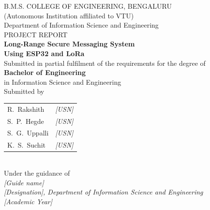 \documentclass[12pt,a4paper,oneside]{report}
\begin{document}
\begin{titlepage}
\centering
\vspace*{0.5cm}

{\large B.M.S. COLLEGE OF ENGINEERING, BENGALURU}\\[0.2cm]
{\normalsize (Autonomous Institution affiliated to VTU)}\\[1.2cm]

{\large Department of Information Science and Engineering}\\[2.0cm]

{\large PROJECT REPORT}\\[0.6cm]

{\LARGE\bfseries Long-Range Secure Messaging System\\[0.3cm]
Using ESP32 and LoRa}\\[2.0cm]

{\normalsize Submitted in partial fulfilment of the requirements for the degree of}\\[0.3cm]
{\large\bfseries Bachelor of Engineering}\\[0.2cm]
{\normalsize in Information Science and Engineering}\\[1.8cm]

{\normalsize Submitted by}\\[0.4cm]
\begin{tabular}{ll}
R.~Rakshith      & \textit{[USN]} \\
S.~P.~Hegde      & \textit{[USN]} \\
S.~G.~Uppalli    & \textit{[USN]} \\
K.~S.~Suchit     & \textit{[USN]} \\
\end{tabular}\\[1.8cm]

{\normalsize Under the guidance of}\\[0.3cm]
{\large \textit{[Guide name]}}\\
{\normalsize \textit{[Designation], Department of Information Science and Engineering}}\\[1.5cm]

{\normalsize \textit{[Academic Year]}}

\end{titlepage}

\end{document}
